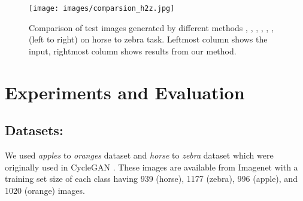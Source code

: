 \documentclass[a4paper,twoside]{article}
\begin{document}
\begin{figure}[!ht] \small
\centering
\texttt{[image: images/comparsion\_h2z.jpg]}
\caption{ Comparison of test images generated by different methods \cite{CycleGAN2017}, \cite{Residual-Attention_WangJQYLZWT17}, \cite{DiscoGAN_KimCKLK17}, \cite{UNIT_LiuBK17}, \cite{DualGAN_YiZTG17}, \cite{Mejjati2018UAIT}, \cite{attentionGAN} (left to right) on horse to zebra task. Leftmost column shows the input, rightmost column shows results from our method.
}
\label{img:Comparison horse to zebra}
\end{figure}
\section{Experiments and Evaluation}
\subsection{Datasets:}
\label{datasets}
\noindent
We used \textit{apples} to \textit{oranges} dataset and \textit{horse} to \textit{zebra} dataset which were originally used in CycleGAN \cite{CycleGAN2017}. These images are available from Imagenet with a training set size of each class having 939 (horse), 1177 (zebra), 996 (apple), and 1020 (orange) images.
\begin{table}[!ht] \footnotesize
\centering
\caption{FID scores between generated samples and target samples for horse to zebra translation task on methods \cite{UNIT_LiuBK17}, \cite{CycleGAN2017}, \cite{Yang2018SAT}, \cite{attentionGAN} (from top to bottom). For this metric, lower is better.}
\label{tab:FID score comparison on Horse to Zebra task}
\end{table}
\end{document}
